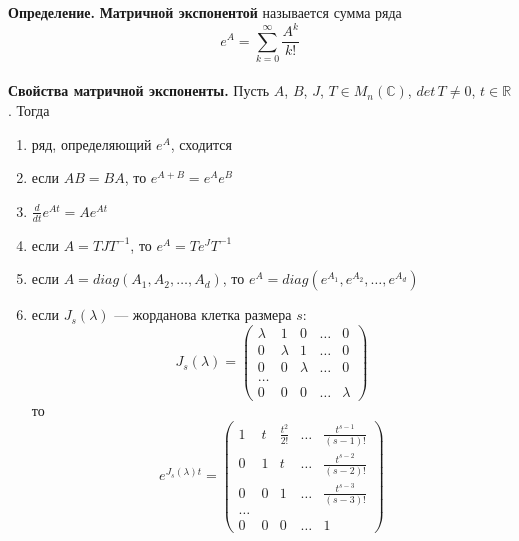 \noindent \textbf{Определение.} \textbf{Матричной экспонентой} называется сумма ряда
\begin{equation*}
    e^{A} = \sum_{k = 0}^{\infty} \frac{A^k}{k!}
\end{equation*}
\\
\noindent \textbf{Свойства матричной экспоненты.} Пусть $A$, $B$, $J$, $T \in M_n(\mathbb{C})$, $det\, T \neq 0$, $t \in \mathbb{R}$. Тогда
\begin{enumerate}
    \item ряд, определяющий $e^A$, сходится
    \item если $AB = BA$, то $e^{A+B} = e^{A}e^{B}$
    \item $\frac{d}{dt}e^{At} = Ae^{At}$
    \item если $A = TJT^{-1}$, то $e^A = Te^JT^{-1}$
    \item если $A = diag(A_1, A_2, \ldots, A_d)$, то $e^A = diag(e^{A_1}, e^{A_2}, \ldots, e^{A_d})$
    \item если $J_s(\lambda)$ --- жорданова клетка размера $s$:
          \begin{equation*}
              J_s(\lambda) = \begin{pmatrix}
                  \lambda & 1       & 0       & \ldots & 0       \\
                  0       & \lambda & 1       & \ldots & 0       \\
                  0       & 0       & \lambda & \ldots & 0       \\
                  \ldots                                         \\
                  0       & 0       & 0       & \ldots & \lambda
              \end{pmatrix}
          \end{equation*}
          то
          \begin{equation*}
              e^{J_s(\lambda)t} = \begin{pmatrix}
                  1 & t & \frac{t^2}{2!} & \ldots & \frac{t^{s-1}}{(s-1)!} \\
                  0 & 1 & t              & \ldots & \frac{t^{s-2}}{(s-2)!} \\
                  0 & 0 & 1              & \ldots & \frac{t^{s-3}}{(s-3)!} \\
                  \ldots                                                   \\
                  0 & 0 & 0              & \ldots & 1
              \end{pmatrix}
          \end{equation*}
\end{enumerate}

